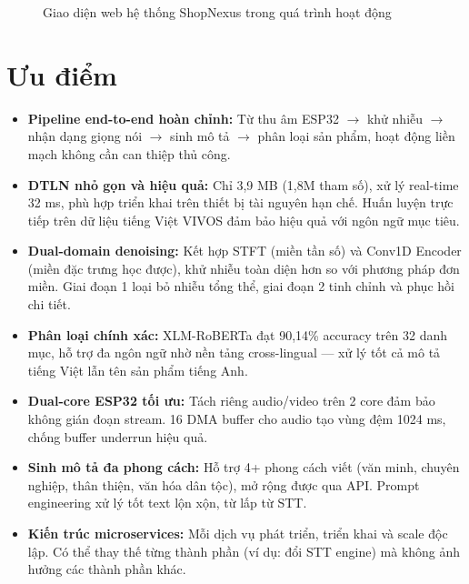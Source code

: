 \begin{figure}[htbp]
\centering
{}
\caption{Giao diện web hệ thống ShopNexus trong quá trình hoạt động}
\label{fig:full-demo}
\end{figure}

\section{Ưu điểm}

\begin{itemize}
\item
  \textbf{Pipeline end-to-end hoàn chỉnh:} Từ thu âm ESP32 $\rightarrow$ khử nhiễu
  $\rightarrow$ nhận dạng giọng nói $\rightarrow$ sinh mô tả $\rightarrow$ phân loại
  sản phẩm, hoạt động liền mạch không cần can thiệp thủ công.
\item
  \textbf{DTLN nhỏ gọn và hiệu quả:} Chỉ 3,9 MB (1,8M tham số), xử lý real-time
  32 ms, phù hợp triển khai trên thiết bị tài nguyên hạn chế. Huấn luyện trực
  tiếp trên dữ liệu tiếng Việt VIVOS đảm bảo hiệu quả với ngôn ngữ mục tiêu.
\item
  \textbf{Dual-domain denoising:} Kết hợp STFT (miền tần số) và Conv1D Encoder
  (miền đặc trưng học được), khử nhiễu toàn diện hơn so với phương pháp đơn miền.
  Giai đoạn 1 loại bỏ nhiễu tổng thể, giai đoạn 2 tinh chỉnh và phục hồi chi tiết.
\item
  \textbf{Phân loại chính xác:} XLM-RoBERTa đạt 90,14\% accuracy trên 32 danh mục,
  hỗ trợ đa ngôn ngữ nhờ nền tảng cross-lingual --- xử lý tốt cả mô tả tiếng Việt
  lẫn tên sản phẩm tiếng Anh.
\item
  \textbf{Dual-core ESP32 tối ưu:} Tách riêng audio/video trên 2 core đảm bảo
  không gián đoạn stream. 16 DMA buffer cho audio tạo vùng đệm 1024 ms,
  chống buffer underrun hiệu quả.
\item
  \textbf{Sinh mô tả đa phong cách:} Hỗ trợ 4+ phong cách viết (văn minh,
  chuyên nghiệp, thân thiện, văn hóa dân tộc), mở rộng được qua API.
  Prompt engineering xử lý tốt text lộn xộn, từ lấp từ STT.
\item
  \textbf{Kiến trúc microservices:} Mỗi dịch vụ phát triển, triển khai và
  scale độc lập. Có thể thay thế từng thành phần (ví dụ: đổi STT engine)
  mà không ảnh hưởng các thành phần khác.
\end{itemize}


